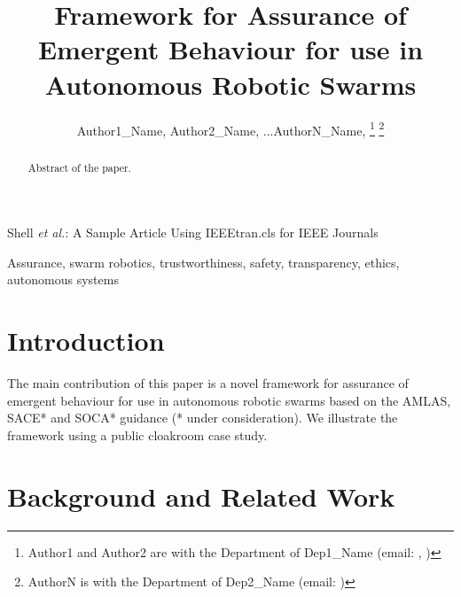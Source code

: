 \documentclass[lettersize,journal]{IEEEtran}
\begin{document}
\title{Framework for Assurance of Emergent Behaviour for use in Autonomous Robotic Swarms}

\author{Author1\_Name, Author2\_Name, ...AuthorN\_Name,
\thanks{Author1 and Author2 are with the Department of Dep1\_Name (email: , )}
\thanks{AuthorN is with the Department of Dep2\_Name (email: )}}
%
{Shell \MakeLowercase{\textit{et al.}}: A Sample Article Using IEEEtran.cls for IEEE Journals}


\maketitle

\begin{abstract}
	Abstract of the paper.
\end{abstract}

\begin{IEEEkeywords}
	Assurance, swarm robotics, trustworthiness, safety, transparency, ethics, autonomous systems
\end{IEEEkeywords}

\section{Introduction}\label{introduction}
The main contribution of this paper is a novel framework for assurance of emergent behaviour for use in autonomous robotic swarms based on the AMLAS, SACE* and SOCA* guidance (* under consideration). We illustrate the framework using a public cloakroom case study. 



\section{Background and Related Work}\label{background-relatedwork}
\end{document}
